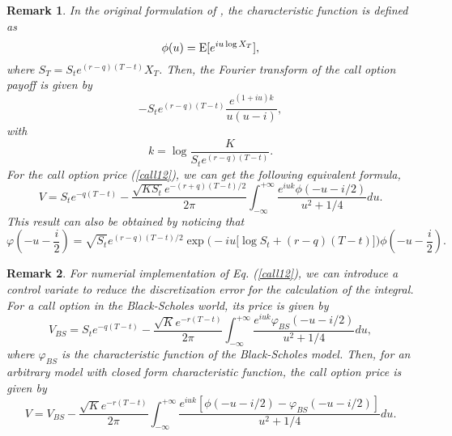 \documentclass[12pt]{article}
\newtheorem{remark}{Remark}
\begin{document}
    \begin{remark}
      In the original formulation of \cite{Lewis}, the characteristic function is defined as
      \begin{equation}
        \phi(u)={\rm E}[e^{iu\log X_T}],
      \end{equation}
      where $S_T=S_te^{(r-q)(T-t)}X_T$. Then, the Fourier transform of the call option payoff is given by
      \begin{equation}
        -S_te^{(r-q)(T-t)}\frac{e^{(1+iu)k}}{u(u-i)},
      \end{equation}
      with
      \begin{equation}
        k=\log\frac{K}{S_te^{(r-q)(T-t)}}.
      \end{equation}
      For the call option price (\ref{call12}), we can get the following equivalent formula,
      \begin{equation}
        V = S_te^{-q(T-t)} - \frac{\sqrt{KS_t}e^{-(r+q)(T-t)/2}}{2\pi}\int_{-\infty}^{+\infty}\frac{e^{iuk}\phi\left(-u-i/2\right)}{u^2+1/4}du.
      \end{equation}
      This result can also be obtained by noticing that
      \begin{equation}
        \varphi\left(-u-\frac{i}{2}\right)=\sqrt{S_t}e^{(r-q)(T-t)/2}\exp\Big(-iu\big[\log S_t+(r-q)(T-t)\big]\Big)\phi\left(-u-\frac{i}{2}\right).
      \end{equation}
    \end{remark}

    \begin{remark}
      For numerial implementation of Eq. (\ref{call12}), we can introduce a control variate to reduce the discretization error for the calculation
      of the integral. For a call option in the Black-Scholes world, its price is given by
      \begin{equation}
        V_{BS} = S_te^{-q(T-t)} - \frac{\sqrt{K}e^{-r(T-t)}}{2\pi}\int_{-\infty}^{+\infty}\frac{e^{iuk}\varphi_{BS}\left(-u-i/2\right)}{u^2+1/4}du,
      \end{equation}
      where $\varphi_{BS}$ is the characteristic function of the Black-Scholes model. Then, for an arbitrary model with closed form characteristic
      function, the call option price is given by
      \begin{equation}
        V = V_{BS} - \frac{\sqrt{K}e^{-r(T-t)}}{2\pi}\int_{-\infty}^{+\infty}
            \frac{e^{iuk}\left[\phi\left(-u-i/2\right)-\varphi_{BS}\left(-u-i/2\right)\right]}{u^2+1/4}du.
      \end{equation}
    \end{remark}
\end{document}
